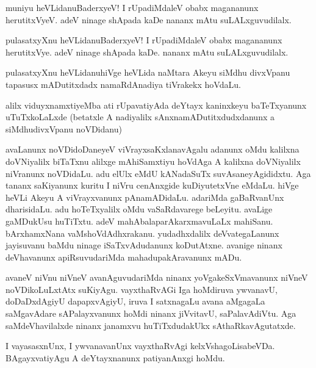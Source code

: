 \begin{mng}
muniyu heVLidanu\mdash BaderxyeV! I rUpadiMdaleV obabx magananunx herutitxVyeV. adeV ninage shApada kaDe nananx mAtu suLALxguvudilalx.
\end{mng}

\begin{mng}
pulasatxyXnu heVLidanu\mdash BaderxyeV! I rUpadiMdaleV obabx magananunx herutitxVye. adeV ninage shApada kaDe. nananx mAtu suLALxguvudilalx.
\end{mng}

\begin{mng}
pulasatxyXnu heVLidanu\mdash hiVge heVLida naMtara Akeyu siMdhu divxVpanu tapasusx mADutitxdadx namaRdAnadiya tiVrakekx hoVdaLu.
\end{mng}

\begin{mng}
alilx viduyxnamxtiyeMba ati rUpavatiyAda deYtayx kaninxkeyu baTeTxyanunx uTuTxkoLaLxde (betatxle A nadiyalilx sAnxnamADutitxdudxdanunx a siMdhudivxVpanu noVDidanu)
\end{mng}

\begin{mng}
avaLanunx noVDidoDaneyeV viVrayxsaKxlanavAgalu adanunx oMdu kalilxna doVNiyalilx biTaTxnu alilxge mAhiSamxtiyu hoVdAga A kalilxna doVNiyalilx niVranunx noVDidaLu. adu elUlx eMdU kANadaSuTx suvAsaneyAgididxtu. Aga tananx saKiyanunx kuritu I niVru cenAnxgide kuDiyutetxVne eMdaLu. hiVge heVLi Akeyu A viVrayxvanunx pAnamADidaLu. adariMda gaBaRvanUnx dharisidaLu. adu hoTeTxyalilx oMdu vaSaRdavarege beLeyitu. avaLige gaMDukUsu huTiTxtu. adeV mahAbalaparAkarxmavuLaLx mahiSanu. bArxhamxNana vaMshoVdAdhxrakanu. yudadhxdalilx deVvategaLanunx jayisuvanu baMdu ninage iSaTxvAdudanunx koDutAtxne. avanige ninanx deVhavanunx apiRsuvudariMda mahadupakAravanunx mADu.
\end{mng}

\begin{mng}
avaneV niVnu niVneV avanAguvudariMda ninanx yoVgakeSxVmavanunx niVneV noVDikoLuLxtAtx suKiyAgu. vayxthaRvAGi Iga hoMdiruva ywvanavU, doDaDxdAgiyU dapapxvAgiyU, iruva I satxnagaLu avana aMgagaLa saMgavAdare sAPalayxvanunx hoMdi ninanx jiVvitavU, saPalavAdiVtu. Aga saMdeVhavilalxde ninanx janamxvu huTiTxdudakUkx sAthaRkavAgutatxde.
\end{mng}

\begin{mng}
I vayasasxnUnx, I ywvanavanUnx vayxthaRvAgi kelxVshagoLisabeVDa. BAgayxvatiyAgu A deYtayxnanunx patiyanAnxgi hoMdu.
\end{mng}

